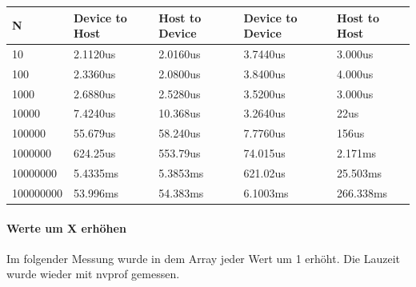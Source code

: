 \documentclass{report}
\begin{document}
\begin{center}
	\begin{tabular}{|l|l|l|l|l|}
		\hline
		N         & Device to Host     & Host to Device     & Device to Device     & Host to Host      \\ \hline \hline
		10			& 2.1120us & 2.0160us &  3.7440us & 3.000us \\ \hline
		100			& 2.3360us & 2.0800us  & 3.8400us & 4.000us\\ \hline
		1000	& 2.6880us & 2.5280us & 3.5200us & 3.000us \\ \hline 
		10000     & 7.4240us & 10.368us & 3.2640us & 22us      \\ \hline
		100000    & 55.679us & 58.240us & 7.7760us & 156us     \\ \hline
		1000000   & 624.25us & 553.79us & 74.015us & 2.171ms   \\ \hline
		10000000  & 5.4335ms & 5.3853ms & 621.02us & 25.503ms  \\ \hline
		100000000 & 53.996ms & 54.383ms & 6.1003ms & 266.338ms \\ \hline
	\end{tabular}
\end{center}

\paragraph{Werte um X erhöhen} Im folgender Messung wurde in dem Array jeder Wert um 1 erhöht. Die Lauzeit wurde wieder mit nvprof gemessen. 
\end{document}
